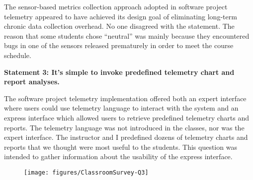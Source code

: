 %

The sensor-based metrics collection approach adopted in software project telemetry appeared to have achieved its design goal of eliminating long-term chronic data collection overhead. No one disagreed with the statement. The reason that some students chose ``neutral'' was mainly because they encountered bugs in one of the sensors released prematurely in order to meet the course schedule.




\newpage
\textbf{Statement 3: It's simple to invoke predefined telemetry chart and report analyses.}

The software project telemetry implementation offered both an expert interface where users could use telemetry language to interact with the system and an express interface which allowed users to retrieve predefined telemetry charts and reports. The telemetry language was not introduced in the classes, nor was the expert interface. The instructor and I predefined dozens of telemetry charts and reports that we thought were most useful to the students. This question was intended to gather information about the usability of the express interface.

\begin{quote}\end{quote} %

\begin{figure}[h]
  \center
  \texttt{[image: figures/ClassroomSurvey-Q3]}
  \label{fig:InClassSurvey-Q3}
\end{figure}


